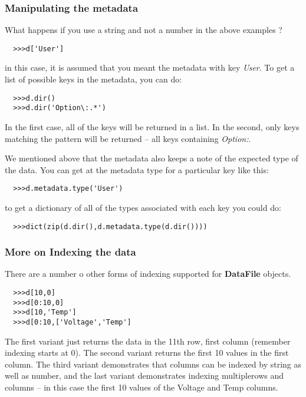 \documentclass[a4paper,11pt]{scrartcl}
\begin{document}
\subsubsection{Manipulating the metadata}

What happens if you use a string and not a number in the above examples ?
\begin{verbatim}
  >>>d['User']
\end{verbatim}
in this case, it is assumed that you meant the metadata with key \textit{User}. To get a list of possible keys in the metadata, you can do:
\begin{verbatim}
  >>>d.dir()
  >>>d.dir('Option\:.*')
\end{verbatim}
In the first case, all of the keys will be returned in a list. In the second, only keys matching the pattern will be returned -- all keys containing \textit{Option:}.

We mentioned above that the metadata also keeps a note of the expected type of the data. You can get at the metadata type for a particular key like this:
\begin{verbatim}
  >>>d.metadata.type('User')
\end{verbatim}
to get a dictionary of all of the types associated with each key you could do:
\begin{verbatim}
  >>>dict(zip(d.dir(),d.metadata.type(d.dir())))
\end{verbatim}

\subsubsection{More on Indexing the data}

There are a number o other forms of indexing supported for \textbf{DataFile} objects.

\begin{verbatim}
  >>>d[10,0]
  >>>d[0:10,0]
  >>>d[10,'Temp']
  >>>d[0:10,['Voltage','Temp']
\end{verbatim}

The first variant just returns the data in the 11th row, first column (remember indexing starts at 0). The second variant returns the first 10 values in the first column. The third variant demonstrates that columns can be indexed by string as well as number, and the last variant demonstrates indexing multiplerows and columns -- in this case the first 10 values of the Voltage and Temp columns.
\end{document}
